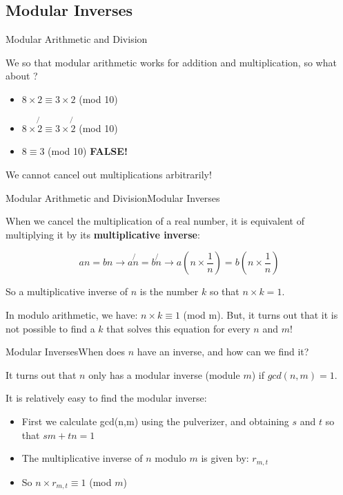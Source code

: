 
\subsection{Modular Inverses}

\begin{frame}{Modular Arithmetic and Division}

  We so that modular arithmetic works for addition and multiplication, so what about ?\bigskip

  \begin{itemize}
    \item $8\times 2 \equiv 3\times 2$ (mod 10)
    \item $8\times \not{2} \equiv 3\times \not{2}$ (mod 10)
    \item $8 \equiv 3$ (mod 10) \hspace{2cm} \alert{\bf FALSE!}
  \end{itemize}\bigskip

  We cannot cancel out multiplications arbitrarily!
\end{frame}

\begin{frame}{Modular Arithmetic and Division}{Modular Inverses}

  When we cancel the multiplication of a real number, it is equivalent of multiplying it by its {\bf multiplicative inverse}:

  \begin{equation*}
    an = bn \to a\not{n} = b\not{n} \to a(n\times \frac{1}{n}) = b(n\times \frac{1}{n})
  \end{equation*}

  So a multiplicative inverse of $n$ is the number $k$ so that $n\times k =1$.\bigskip

  In modulo arithmetic, we have: $n\times k \equiv 1$ (mod m). But, it turns out that it is not possible to find a $k$ that solves this equation for every $n$ and $m$!
\end{frame}


\begin{frame}{Modular Inverses}{When does $n$ have an inverse, and how can we find it?}

  It turns out that $n$ only has a modular inverse (module $m$) if $gcd(n,m) = 1$.\bigskip

  It is relatively easy to find the modular inverse:
  \begin{itemize}
    \item First we calculate gcd(n,m) using the pulverizer, and obtaining $s$ and $t$ so that $sm+tn=1$
    \item The multiplicative inverse of $n$ modulo $m$ is given by: $r_{m,t}$
    \item So $n\times r_{m,t} \equiv 1$ (mod $m$)
  \end{itemize}
\end{frame}

